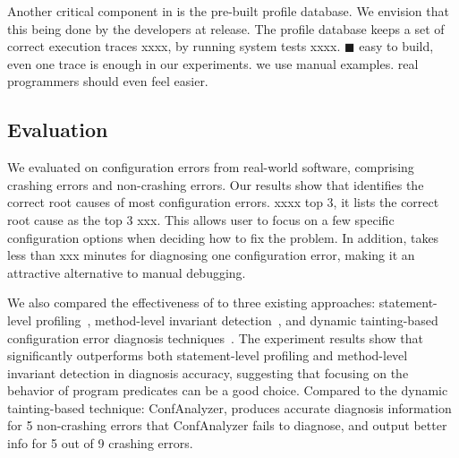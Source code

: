 Another critical component in \ourtool is the pre-built
profile database. We envision that this being done
by the developers at release. The profile database keeps
a set of correct execution traces xxxx, by running system
tests xxxx. $\blacksquare$ easy to build, even one trace
is enough in our experiments. we use manual examples. real programmers
should even feel easier.



 









\subsection{Evaluation}

We evaluated \ourtool on \errors configuration errors
from \subjectnum real-world software, comprising
\crash crashing errors and \noncrash non-crashing errors.
Our results show that \ourtool identifies the correct
root causes of most configuration errors. xxxx top 3,
it lists the correct root cause as the top 3 xxx.
This allows \ourtool user to focus on a few specific configuration
options when deciding how to fix the problem. 
In addition, \ourtool takes less than xxx minutes for diagnosing
one configuration error, making it an attractive alternative
to manual debugging.

We also compared the effectiveness of \ourtool to
three existing approaches: statement-level profiling~\cite{Jones:2002}, method-level
invariant detection~\cite{Ernst:1999}, and dynamic tainting-based configuration
error diagnosis techniques~\cite{Rabkin:2011:PPC}. The experiment results show that
\ourtool significantly outperforms both statement-level profiling
and method-level invariant detection in diagnosis accuracy, suggesting
that focusing on the behavior of program predicates can be a
good choice. Compared to the dynamic tainting-based technique: ConfAnalyzer, \ourtool
produces accurate diagnosis information for 5 non-crashing errors that
ConfAnalyzer fails to diagnose, and output better info for 5 out of 9
crashing errors. 

